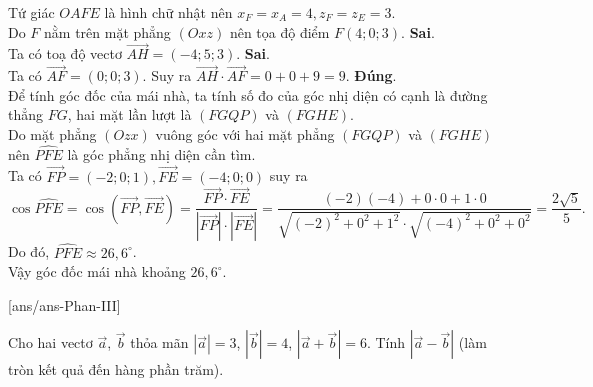 \begin{ex}
{\begin{itemchoice}
Tứ giác $OAFE$ là hình chữ nhật nên $x_F=x_A=4, z_F=z_E=3$.\\
Do $F$ nằm trên mặt phẳng $(Oxz)$ nên tọa độ điểm $F(4; 0; 3)$.
 \itemch \textbf{Sai}.\\
Ta có toạ độ vectơ $\overrightarrow{AH}=(-4; 5; 3)$.
 \itemch \textbf{Sai}.\\
Ta có $\overrightarrow{AF}=(0; 0; 3)$. Suy ra $\overrightarrow{AH}\cdot\overrightarrow{AF}=0+0+9=9$.
 \itemch \textbf{Đúng}.\\
Để tính góc đốc của mái nhà, ta tính số đo của góc nhị diện có cạnh là đường thẳng $FG$, hai mặt lần lượt là $(FGQP)$ và $(FGHE)$.\\
Do mặt phẳng $(O z x)$ vuông góc với hai mặt phẳng $(FGQP)$ và $(F G H E)$ nên $\widehat{PFE}$ là góc phẳng nhị diện cần tìm.\\
Ta có $\overrightarrow{FP}=(-2; 0; 1), \overrightarrow{FE}=(-4; 0; 0)$ suy ra 
\[\cos\widehat{PFE}=\cos \left(\overrightarrow{FP}, \overrightarrow{FE}\right)=\dfrac{\overrightarrow{FP} \cdot \overrightarrow{FE}}{\left|\overrightarrow{FP}\right|\cdot\left|\overrightarrow{FE}\right|}= \dfrac{(-2)(-4)+0\cdot 0+1\cdot 0}{\sqrt{(-2)^2+0^2+1^2} \cdot \sqrt{(-4)^2+0^2+0^2}}=\dfrac{2 \sqrt{5}}{5}.\]
Do đó, $\widehat{PFE} \approx 26{,}6^{\circ}$.\\
Vậy góc đốc mái nhà khoảng $26{,}6^{\circ}$.
\end{itemchoice}
 }
\end{ex}

\TNSA
{}[ans/ans\currfilebase-Phan-III]
\begin{ex}%
Cho hai vectơ $\overrightarrow{a}$, $\overrightarrow{b}$ thỏa mãn $\left|\overrightarrow{a}\right|=3$, $\left|\overrightarrow{b}\right|=4$, $\left|\overrightarrow{a}+\overrightarrow{b}\right|=6$. Tính $\left|\overrightarrow{a}-\overrightarrow{b}\right|$ (làm tròn kết quả đến hàng phần trăm).
\end{ex}

